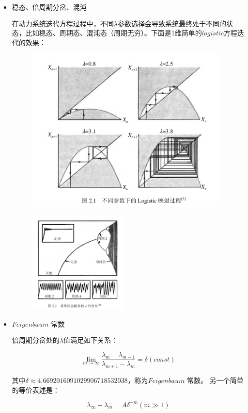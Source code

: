 \documentclass[UTF8]{ctexart}
\begin{document}
	\begin{itemize}
		\item 稳态、倍周期分岔、混沌
		
		在动力系统迭代方程过程中，不同$\lambda$参数选择会导致系统最终处于不同的状态，比如稳态、周期态、混沌态（周期无穷）。下面是1维简单的$logistic$方程迭代的效果：
		
			\begin{figure}[H]
				\centering\includegraphics[width=4in]{eg}
				\end{figure}
		
			\begin{figure}[H]
			\centering\includegraphics[width=2in]{x}
		\end{figure}
		\item $Feigenbaum$ 常数
		
		倍周期分岔处的$\lambda$值满足如下关系：
		
		$$\lim\limits_{m\rightarrow\infty}\frac{\lambda_m-\lambda_{m-1} }{\lambda_{m+1}-\lambda_{m}}=\delta(const)$$
		
		其中$\delta\approx4.669 201609102 990 671853 2038$，称为$Feigenbaum$ 常数。
		另一个简单的等价表述是：
		
		$$\lambda_{\infty}-\lambda_m=A\delta^{-m}(m\gg1)$$
		

\end{itemize}
\end{document}
